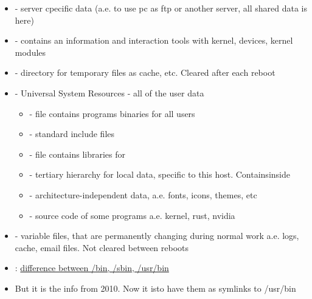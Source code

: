 \documentclass[usenames,dvipsnames,10pt,aspectratio=169]{beamer}
\begin{document}
\begin{frame}
    \begin{itemize}
        \item {}- server cpecific data (a.e. to use pc as ftp or another server, all shared data is here)
        \item {}- contains an information and interaction tools with kernel, devices, kernel modules
        \item {}- directory for temporary files as cache, etc. Cleared after each reboot
        \item {}- Universal System Resources - all of the user data
        \begin{itemize}
            \item {}- file contains programs binaries for all users
            \item {}- standard include files
            \item {}- file contains libraries for
            \item {}- tertiary hierarchy for local data, specific to this host. Containsinside
            \item {}- architecture-independent data, a.e. fonts, icons, themes, etc
            \item {}- source code of some programs a.e. kernel, rust, nvidia
        \end{itemize}
        \item {}- variable files, that are permanently changing during normal work a.e. logs, cache, email files. Not cleared between reboots
        \item {}: \href{http://lists.busybox.net/pipermail/busybox/2010-December/074114.html}{difference between /bin, /sbin, /usr/bin}
        \item But it is the info from 2010. Now it isto have them as symlinks to /usr/bin
    \end{itemize}
    

\end{frame}
\end{document}
